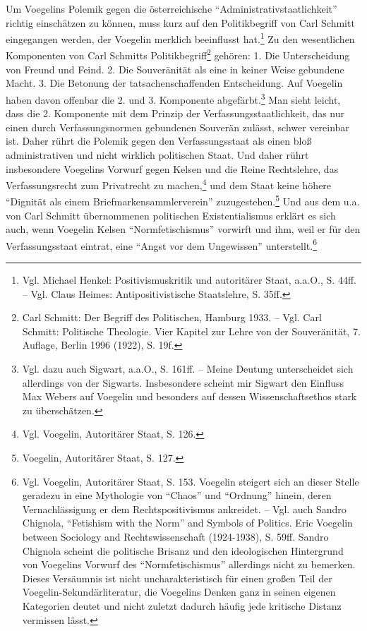 \documentclass[12pt,a4paper,ngerman]{article}
\begin{document}
Um Voegelins Polemik gegen die österreichische
"`Administrativstaatlichkeit"' richtig einschätzen zu können, muss
kurz auf den Politikbegriff von Carl Schmitt eingegangen werden, der
Voegelin merklich beeinflusst hat.\footnote{Vgl. Michael Henkel:
  Positivismuskritik und autoritärer Staat, a.a.O., S. 44ff. -- Vgl.
  Claus Heimes: Antipositivistische Staatslehre, S.  35ff.} Zu den
wesentlichen Komponenten von Carl Schmitts
Politikbegriff\footnote{Carl Schmitt: Der Begriff des Politischen,
  Hamburg 1933. -- Vgl. Carl Schmitt: Politische Theologie.  Vier
  Kapitel zur Lehre von der Souveränität, 7. Auflage, Berlin 1996
  (1922), S. 19f.} gehören: 1.  Die Unterscheidung von Freund und
Feind. 2. Die Souveränität als eine in keiner Weise gebundene Macht.
3. Die Betonung der tatsachenschaffenden Entscheidung.  Auf Voegelin
haben davon offenbar die 2. und 3. Komponente abgefärbt.\footnote{Vgl.
  dazu auch Sigwart, a.a.O., S. 161ff. -- Meine Deutung unterscheidet
  sich allerdings von der Sigwarts. Insbesondere scheint mir Sigwart
  den Einfluss Max Webers auf Voegelin und besonders auf dessen
  Wissenschaftsethos stark zu überschätzen.} Man sieht leicht, dass
die 2.  Komponente mit dem Prinzip der Verfassungsstaatlichkeit, das
nur einen durch Verfassungsnormen gebundenen Souverän zulässt, schwer
vereinbar ist.  Daher rührt die Polemik gegen den Verfassungsstaat als
einen bloß administrativen und nicht wirklich politischen Staat. Und
daher rührt insbesondere Voegelins Vorwurf gegen Kelsen und die Reine
Rechtslehre, das Verfassungsrecht zum Privatrecht zu
machen,\footnote{Vgl.  Voegelin, Autoritärer Staat, S.  126.}  und dem
Staat keine höhere "`Dignität als einem Briefmarkensammlerverein"'
zuzugestehen.\footnote{Voegelin, Autoritärer Staat, S. 127.} Und aus
dem u.a.  von Carl Schmitt übernommenen politischen Existentialismus
erklärt es sich auch, wenn Voegelin Kelsen "`Normfetischismus"'
vorwirft und ihm, weil er für den Verfassungsstaat eintrat, eine
"`Angst vor dem Ungewissen"' unterstellt.\footnote{Vgl.  Voegelin,
  Autoritärer Staat, S. 153.  Voegelin steigert sich an dieser Stelle
  geradezu in eine Mythologie von "`Chaos"' und "`Ordnung"' hinein,
  deren Vernachlässigung er dem Rechtspositivismus ankreidet.  -- Vgl.
  auch Sandro Chignola, "`Fetishism with the Norm"' and Symbols of
  Politics. Eric Voegelin between Sociology and Rechtswissenschaft
  (1924-1938), S. 59ff.  Sandro Chignola scheint die politische
  Brisanz und den ideologischen Hintergrund von Voegelins Vorwurf des
  "`Normfetischismus"' allerdings nicht zu bemerken. Dieses Versäumnis
  ist nicht uncharakteristisch für einen großen Teil der
  Voegelin-Sekundärliteratur, die Voegelins Denken ganz in seinen
  eigenen Kategorien deutet und nicht zuletzt dadurch häufig jede
  kritische Distanz vermissen lässt.}
\end{document}
